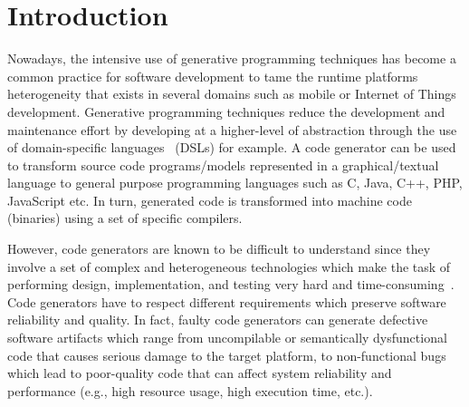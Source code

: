 \section{Introduction}

\enlargethispage{0.5cm}


Nowadays, the intensive use of generative programming techniques has become a common practice for software development to tame the runtime platforms heterogeneity that exists in several domains such as mobile or Internet of Things development.  Generative programming techniques reduce the development and maintenance effort by developing at a higher-level of abstraction through the use of domain-specific languages~\cite{brambilla2012model} (DSLs) for example. 
A code generator can be used to transform source code programs/models represented in a graphical/textual  language to general purpose programming languages such as C, Java, C++, PHP, JavaScript etc. In turn, generated code is transformed into machine code (binaries) using a set of specific compilers.


However, code generators are known to be difficult to understand since they involve a set of complex and heterogeneous technologies which make the task of performing design, implementation, and testing very hard and time-consuming~\cite{france2007model,guana2015developers}. Code generators have to respect different requirements which preserve software reliability and quality. In fact, faulty code generators can generate defective software artifacts which range from uncompilable or semantically dysfunctional code that causes serious damage to the target platform, to non-functional bugs which lead to poor-quality code that can affect system reliability and performance (e.g., high resource usage, high execution time, etc.). 

